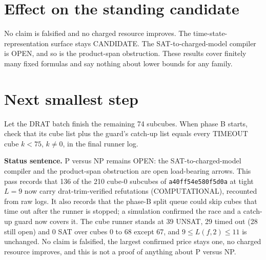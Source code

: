 \documentclass[11pt]{article}
\begin{document}
\section*{Effect on the standing candidate}
No claim is falsified and no charged resource improves. The time-state-representation surface stays CANDIDATE. The SAT-to-charged-model compiler is OPEN, and so is the product-span obstruction. These results cover finitely many fixed formulas and say nothing about lower bounds for any family.

\section*{Next smallest step}
Let the DRAT batch finish the remaining 74 subcubes. When phase B starts, check that its cube list plus the guard's catch-up list equals every TIMEOUT cube $k<75$, $k\ne0$, in the final runner log.

\bigskip
\noindent\textbf{Status sentence.} P versus NP remains OPEN: the SAT-to-charged-model compiler and the product-span obstruction are open load-bearing arrows. This pass records that 136 of the 210 cube-0 subcubes of \texttt{a40ff54e580f5d0a} at tight $L=9$ now carry drat-trim-verified refutations (COMPUTATIONAL), recounted from raw logs. It also records that the phase-B split queue could skip cubes that time out after the runner is stopped; a simulation confirmed the race and a catch-up guard now covers it. The cube runner stands at 39 UNSAT, 29 timed out (28 still open) and 0 SAT over cubes 0 to 68 except 67, and $9\le L(f,2)\le 11$ is unchanged. No claim is falsified, the largest confirmed price stays one, no charged resource improves, and this is not a proof of anything about P versus NP.
\end{document}
